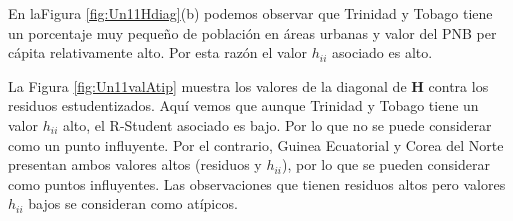 \documentclass[
]{article}
\begin{document}
En laFigura \ref{fig:Un11Hdiag}(b) podemos observar que Trinidad y Tobago tiene un porcentaje muy pequeño de población en áreas urbanas y valor del PNB per cápita relativamente alto. Por esta razón el valor \(h_{ii}\) asociado es alto.

La Figura \ref{fig:Un11valAtip} muestra los valores de la diagonal de \(\boldsymbol H\) contra los residuos estudentizados. Aquí vemos que aunque Trinidad y Tobago tiene un valor \(h_{ii}\) alto, el R-Student asociado es bajo. Por lo que no se puede considerar como un punto influyente. Por el contrario, Guinea Ecuatorial y Corea del Norte presentan ambos valores altos (residuos y \(h_{ii}\)), por lo que se pueden considerar como puntos influyentes. Las observaciones que tienen residuos altos pero valores \(h_{ii}\) bajos se consideran como atípicos.
\end{document}
